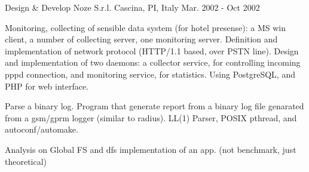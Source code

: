 \begin{cventries}
  \cventry
    {Design \& Develop} %
    {Noze S.r.l.} %
    {Cascina, PI, Italy} %
    {Mar. 2002 - Oct 2002} %
    {
      \begin{cvitems} %
        \item {Monitoring, collecting of sensible data system (for hotel presense): a MS win client, a number of collecting server, one monitoring server. Definition and implementation of network protocol (HTTP/1.1 based, over PSTN line). Design and implementation of two daemons: a collector service, for controlling incoming pppd connection, and monitoring
service, for statistics. Using PostgreSQL, and PHP for web interface.}
        \item {Parse a binary log. Program that generate report from a binary log file genarated from a gsm/gprm logger (similar to radius). LL(1) Parser, POSIX pthread, and autoconf/automake.}
        \item {Analysis on Global FS and dfs implementation of an app. (not benchmark, just theoretical) }
      \end{cvitems}
    }

\end{cventries}